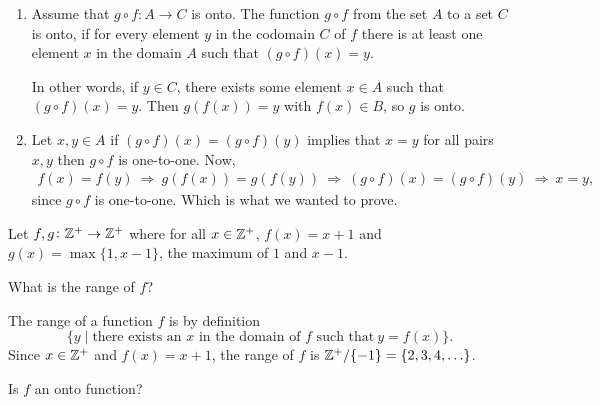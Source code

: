 \documentclass[a4paper, english, 12pt]{article} %
\begin{document}
\begin{answer}
  \begin{enumerate}[label = (\alph*)]
    \item Assume that $g \circ f \colon A \to C$ is onto. The function $g \circ
      f$ from the set $A$ to a set $C$ is onto, if for every element $y$ in the
      codomain $C$ of $f$ there is at least one element $x$ in the domain $A$
      such that $(g \circ f)(x) = y.$

      In other words, if $y \in C$, there exists some element $x \in A$ such that
      $(g \circ f)(x) = y$. Then $g(f(x)) = y$ with $f(x) \in B$, so $g$ is
      onto.

      \item Let $x, y \in A$ if $(g \circ f)(x) = (g \circ f)(y)$ implies that $x = y$ for
      all pairs $x,y$ then $g \circ f$ is one-to-one. Now,
      \begin{align*}
        f(x) = f(y)
        \ \Rightarrow \ g(f(x)) = g(f(y))
        \ \Rightarrow \ (g \circ f)(x) = (g \circ f)(y)
        \ \Rightarrow \ x = y,
      \end{align*}
      since $g \circ f$ is one-to-one. Which is what we wanted to prove.
  \end{enumerate}
\end{answer}

\begin{problem}[17]
  Let $f, g \colon \mathbb{Z}^+ \to \mathbb{Z}^+$ where for all $x \in \mathbb{Z}^+$, $f(x) = x + 1$ and
  $g(x) = \max\{1, x - 1\}$, the maximum of $1$ and $x - 1$. 
\end{problem}

\begin{subproblem}
  What is the range of $f$?
\end{subproblem} 

\begin{answer}
  The range of a function $f$ is by definition
  \begin{equation*}
    \{y \mid \text{there exists an $x$ in the domain of $f$ such that} \ y = f(x)\}.
  \end{equation*}
  Since $x \in \mathbb{Z}^+$ and $f(x) = x + 1$, the range of $f$ is $\mathbb{Z}^+ / \{-1\} = \{2, 3, 4, \ldots\}$.
\end{answer}

\begin{answer}
\end{answer}

\begin{subproblem}
  \label{subproblem:17b}
  Is $f$ an onto function?
\end{subproblem}
\end{document}
